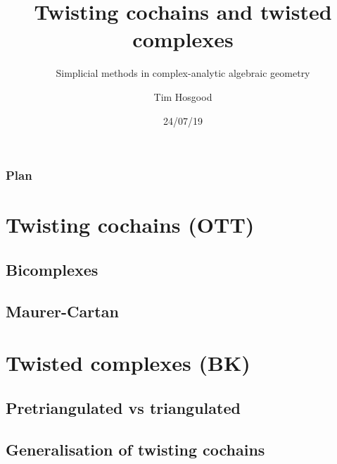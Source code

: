 \documentclass{beamer}
\title{Twisting cochains and twisted complexes}
\subtitle{Simplicial methods in complex-analytic algebraic geometry}
\author{Tim Hosgood}
\institute{Université d'Aix-Marseille}
\date{24/07/19}
\begin{document}
    \begin{frame}
        \titlepage
    \end{frame}

    \begin{frame}
        \frametitle{Plan}
        \tableofcontents
    \end{frame}

    \section{Twisting cochains (OTT)}
        \subsection{Bicomplexes}
        \subsection{Maurer-Cartan}
    \section{Twisted complexes (BK)}
        \subsection{Pretriangulated vs triangulated}
        \subsection{Generalisation of twisting cochains}
\end{document}
